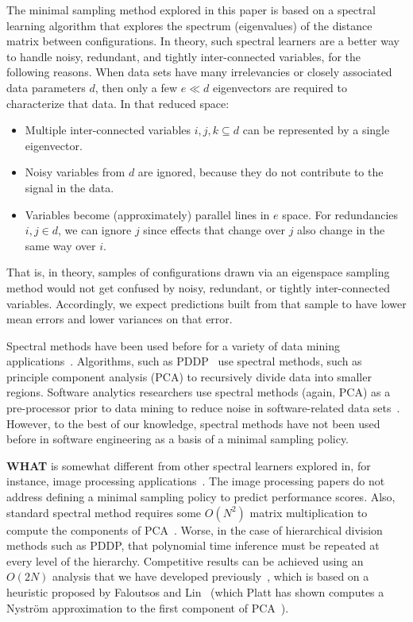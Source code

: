 \documentclass{sig-alternative}
\newcommand{\bi}{\begin{itemize}}%
\newcommand{\ei}{\end{itemize}}
\newcommand{\what}{{\bf WHAT }}
\begin{document}
The minimal sampling method explored in this paper is based on a spectral learning algorithm
that  explores the spectrum (eigenvalues) of the distance matrix between  configurations.
In theory, such spectral learners are a better way to handle noisy, redundant, and tightly inter-connected variables, for the following reasons.
When data sets have many irrelevancies or closely associated data parameters $d$, then
only a few $e \ll d$ eigenvectors are required to characterize that data.
In that reduced space:
\bi
\item
Multiple inter-connected variables $i,j,k \subseteq d$ can be represented
by a single eigenvector.
\item
Noisy variables from $d$ are
ignored, because they  do not contribute to the signal in the data.
\item
Variables  become (approximately) parallel lines
in $e$ space. For  redundancies \mbox{$i,j \in d$}, we
can ignore $j$
since effects that change over $j$ also
change in the same way over $i$.
\ei
That is, in theory, samples of configurations drawn via an eigenspace sampling method
would not get confused by noisy, redundant, or tightly inter-connected variables. Accordingly,
we expect predictions built from that sample to have  lower mean errors and lower variances on that error.

Spectral methods have been used before for a variety of data mining applications~\cite{kamvar2003spectral}.
Algorithms, such as PDDP~\cite{boley98} use spectral methods, such as principle component analysis (PCA) to
recursively divide data into smaller regions.  Software analytics researchers use spectral methods (again, PCA) as a pre-processor prior to data mining  to reduce noise in software-related data sets~\cite{Theisen15}.
However, to the best of our knowledge, spectral methods have not been used before in software engineering as a basis of a minimal sampling policy.



\what is somewhat different from other spectral
learners explored in, for instance, image processing applications~\cite{shi00}.
The image processing papers do not address
defining a minimal sampling policy to predict performance scores.
Also, standard spectral method requires some $O(N^2)$ matrix multiplication to compute the components
of PCA~\cite{ilin10}. Worse, in the case of hierarchical division methods such as PDDP,
that polynomial time inference must be repeated at every level of the hierarchy.
Competitive results can be achieved
using an $O(2N)$ analysis that we have developed previously~\cite{me12d}, which is  based on  a heuristic proposed by Faloutsos and Lin~\cite{Faloutsos1995} (which Platt has shown computes a Nystr\"om approximation to the first component of PCA~\cite{platt05}).
  
\end{document}
